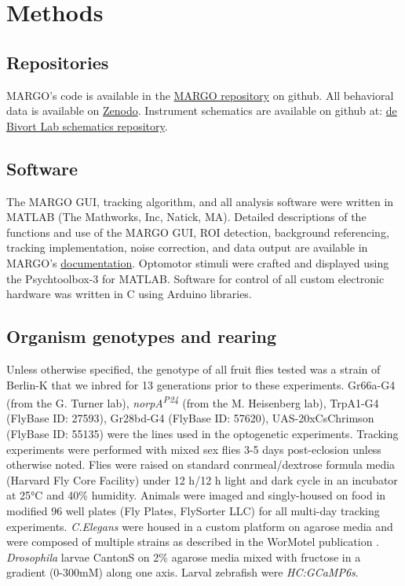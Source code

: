 \documentclass[10pt,letterpaper]{article}
\begin{document}
\section*{Methods}

 \subsection*{Repositories}
MARGO's code is available in the \href{https://github.com/de-Bivort-Lab/margo}{MARGO repository} on github. All behavioral data is available on \href{https://zenodo.org/record/2596143#.XI2maRNKiRc}{Zenodo}. Instrument schematics are available on github at: \href{https://github.com/de-Bivort-Lab/dblab-schematics}{de Bivort Lab schematics repository}.

 \subsection*{Software}
 
The MARGO GUI, tracking algorithm, and all analysis software were written in MATLAB (The Mathworks, Inc, Natick, MA). Detailed descriptions of the functions and use of the MARGO GUI, ROI detection, background referencing, tracking implementation, noise correction, and data output are available in MARGO's \href{https://github.com/de-Bivort-Lab/margo/wiki}{documentation}. Optomotor stimuli were crafted and displayed using the Psychtoolbox-3 for MATLAB. Software for control of all custom electronic hardware was written in C using Arduino libraries.

 \subsection*{Organism genotypes and rearing}
 
Unless otherwise specified, the genotype of all fruit flies tested was a strain of Berlin-K that we inbred for 13 generations prior to these experiments. Gr66a-G4 (from the G. Turner lab), \textit{norpA\textsuperscript{P24}} (from the M. Heisenberg lab), TrpA1-G4 (FlyBase ID: 27593), Gr28bd-G4 (FlyBase ID: 57620), UAS-20xCsChrimson (FlyBase ID: 55135) were the lines used in the optogenetic experiments. Tracking experiments were performed with mixed sex flies 3-5 days post-eclosion unless otherwise noted. Flies were raised on standard conrmeal/dextrose formula media (Harvard Fly Core Facility) under 12 h/12 h light and dark cycle in an incubator at 25°C and 40\% humidity. Animals were imaged and singly-housed on food in modified 96 well plates (Fly Plates, FlySorter LLC) for all multi-day tracking experiments. \textit{C.Elegans} were housed in a custom platform on agarose media and were composed of multiple strains as described in the WorMotel publication \cite{Churgin_Longitudinal_2017}. \textit{Drosophila} larvae CantonS on 2\% agarose media mixed with fructose in a gradient (0-300mM) along one axis. Larval zebrafish were \textit{HC:GCaMP6s}.
\end{document}
